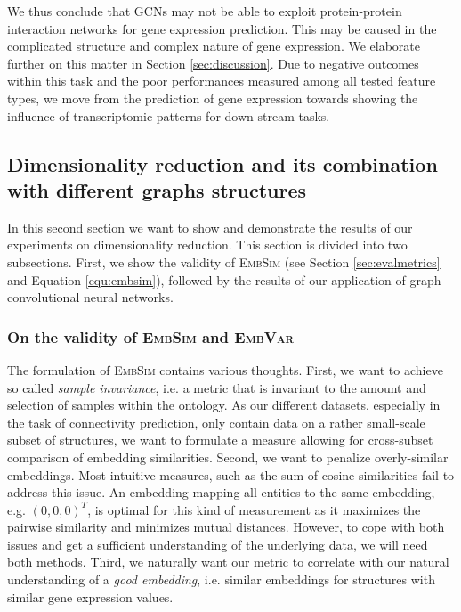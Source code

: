 \documentclass[]{article}
\begin{document}
We thus conclude that GCNs may not be able to exploit protein-protein interaction networks for gene expression prediction. This may be caused in the complicated structure and complex nature of gene expression. We elaborate further on this matter in Section \ref{sec:discussion}. Due to negative outcomes within this task and the poor performances measured among all tested feature types, we move from the prediction of gene expression towards showing the influence of transcriptomic patterns for down-stream tasks. 


\subsection{Dimensionality reduction and its combination with different graphs structures}
\label{sec:results_dimred}

In this second section we want to show and demonstrate the results of our experiments on dimensionality reduction. This section is divided into two subsections. First, we show the validity of \textsc{EmbSim} (see Section \ref{sec:evalmetrics} and Equation \ref{equ:embsim}), followed by the results of our application of graph convolutional neural networks.

\subsubsection{On the validity of \textsc{EmbSim} and \textsc{EmbVar}}
\label{sec:results_embsim}

The formulation of \textsc{EmbSim} contains various thoughts. First, we want to achieve so called \textit{sample invariance}, i.e. a metric that is invariant to the amount and selection of samples within the ontology. As our different datasets, especially in the task of connectivity prediction, only contain data on a rather small-scale subset of structures, we want to formulate a measure allowing for cross-subset comparison of embedding similarities. 
Second, we want to penalize overly-similar embeddings. Most intuitive measures, such as the sum of cosine similarities fail to address this issue. An embedding mapping all entities to the same embedding, e.g. $(0,0,0)^T$, is optimal for this kind of measurement as it maximizes the pairwise similarity and minimizes mutual distances. However, to cope with both issues and get a sufficient understanding of the underlying data, we will need both methods. Third, we naturally want our metric to correlate with our natural understanding of a \textit{good embedding}, i.e. similar embeddings for structures with similar gene expression values.\\
\end{document}
